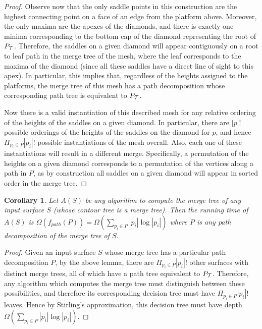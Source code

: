 \documentclass[11pt]{article}
\newtheorem{corollary}[theorem]{Corollary}
\theoremstyle{definition}
\begin{document}
\begin{proof}
 Observe now that the only saddle points in this construction are the highest connecting point on a face of an edge from the platform above.  Moreover, the only maxima are the apexes of the 
 diamonds, and there is exactly one minima corresponding to the bottom cap of the diamond representing the root of $P_{\mathcal{T}}$.  Therefore, the saddles on a given 
 diamond will appear contiguously on a root to leaf path in the merge tree of the mesh, where the leaf corresponds to the maxima of the diamond 
 (since all these saddles have a direct line of sight to this apex).  In particular, 
 this implies that, regardless of the heights assigned to the platforms, the merge tree of this mesh has a path decomposition whose corresponding path 
 tree is equivalent to $P_{\mathcal{T}}$.  
 
 Now there is a valid instantiation of this described mesh for any relative ordering of the heights of the saddles on a given diamond.  In particular, 
 there are $|p|!$ possible orderings of the heights of the saddles on the diamond for $p$, and hence $\Pi_{p_i\in P} |p_i|!$ possible instantiations of 
 the mesh overall.  Also, each one of these instantiations will result in a different merge.  Specifically, a permutation of the heights on a given diamond 
 corresponds to a permutation of the vertices along a path in $P$, as by construction all saddles on a given diamond will appear in sorted order in the merge tree.
\end{proof}



\begin{corollary}
 Let $A(S)$ be any algorithm to compute the merge tree of any input surface $S$ (whose contour tree is a merge tree).  
 Then the running time of $A(S)$ is $\Omega(f_{path}(P))=\Omega(\sum_{p_i\in P} |p_i|\log|p_i|)$ where $P$ is any path decomposition of the 
 merge tree of $S$.
\end{corollary}
\begin{proof}
 Given an input surface $S$ whose merge tree has a particular path decomposition $P$, by the above lemma, there are $\Pi_{p_i\in P} |p_i|!$ other surfaces 
 with distinct merge trees, all of which have a path tree equivalent to $P_{\mathcal{T}}$.  Therefore, any algorithm which computes the merge tree must distinguish between 
 these possibilities, and therefore its corresponding decision tree must have $\Pi_{p_i\in P} |p_i|!$ leaves.  Hence by Stirling's approximation, 
 this decision tree must have depth $\Omega(\sum_{p_i\in P} |p_i|\log|p_i|)$.
\end{proof}
\end{document}
